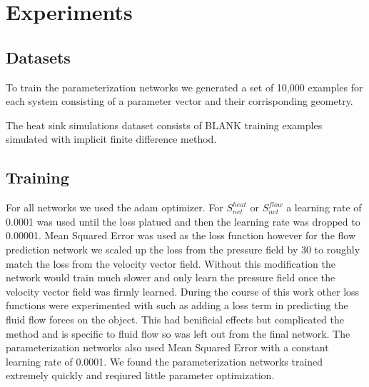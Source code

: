 \documentclass{article} %
\begin{document}
\section{Experiments}


\subsection{Datasets}

To train the parameterization networks we generated a set of 10,000 examples for each system consisting of a parameter vector and their corrisponding geometry. 

The heat sink simulations dataset consists of BLANK training examples simulated with implicit finite difference method.

\subsection{Training}

For all networks we used the adam optimizer. For $S^{heat}_{net}$ or $S^{flow}_{net}$ a learning rate of 0.0001 was used until the loss platued and then the learning rate was dropped to 0.00001. Mean Squared Error was used as the loss function however for the flow prediction network we scaled up the loss from the pressure field by 30 to roughly match the loss from the velocity vector field. Without this modification the network would train much slower and only learn the pressure field once the velocity vector field was firmly learned. During the course of this work other loss functions were experimented with such as adding a loss term in predicting the fluid flow forces on the object. This had benificial effects but complicated the method and is specific to fluid flow so was left out from the final network. The parameterization networks also used Mean Squared Error with a constant learning rate of 0.0001. We found the parameterization networks trained extremely quickly and reqiured little parameter optimization.
\end{document}
